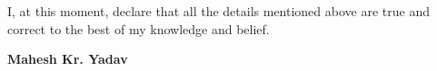 
\begin{cvparagraph}

I, at this moment, declare that all the details mentioned above are true and correct to the best of my knowledge
and belief.
   
\hfill \textbf{Mahesh Kr. Yadav}
\begin{flushright}
\end{flushright}
\end{cvparagraph}
